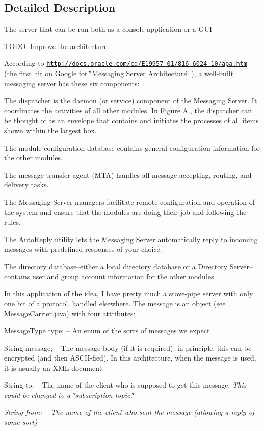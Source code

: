 \subsection{Detailed Description}
The server that can be run both as a console application or a G\-U\-I

T\-O\-D\-O\-: Improve the architecture

According to \href{http://docs.oracle.com/cd/E19957-01/816-6024-10/apa.htm}{\tt http\-://docs.\-oracle.\-com/cd/\-E19957-\/01/816-\/6024-\/10/apa.\-htm} (the first hit on Google for \char`\"{}\-Messaging Server Architecture\char`\"{} ), a well-\/built messaging server has these six components\-: 
\begin{DoxyItemize}
\item The dispatcher is the daemon (or service) component of the Messaging Server. It coordinates the activities of all other modules. In Figure A., the dispatcher can be thought of as an envelope that contains and initiates the processes of all items shown within the largest box. 
\item The module configuration database contains general configuration information for the other modules. 
\item The message transfer agent (M\-T\-A) handles all message accepting, routing, and delivery tasks. 
\item The Messaging Server managers facilitate remote configuration and operation of the system and ensure that the modules are doing their job and following the rules. 
\item The Auto\-Reply utility lets the Messaging Server automatically reply to incoming messages with predefined responses of your choice. 
\item The directory database--either a local directory database or a Directory Server--contains user and group account information for the other modules. 
\end{DoxyItemize}

In this application of the idea, I have pretty much a stove-\/pipe server with only one bit of a protocol, handled elsewhere. The message is an object (see Message\-Carrier.\-java) with four attributes\-: 
\begin{DoxyItemize}
\item \hyperlink{enumgov_1_1fnal_1_1ppd_1_1dd_1_1chat_1_1MessageType}{Message\-Type} type; -- An enum of the sorts of messages we expect 
\item String message; -- The message body (if it is required). in principle, this can be encrypted (and then A\-S\-C\-I\-I-\/fied). In this architecture, when the message is used, it is usually an X\-M\-L document 
\item String to; -- The name of the client who is supposed to get this message. {\itshape This could be changed to a {\itshape \char`\"{}subscription topic.\char`\"{}} }
\item {\itshape String from; -- The name of the client who sent the message (allowing a reply of some sort) }
\end{DoxyItemize}


